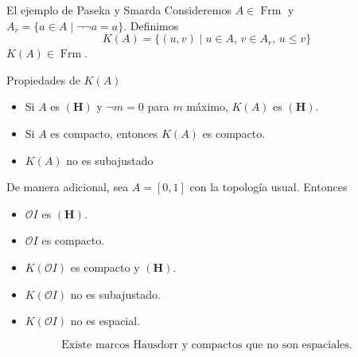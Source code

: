 \documentclass[compress,12pt]{beamer}
\DeclareMathOperator{\Frm}{Frm}
\begin{document}
\begin{frame}{El ejemplo de Paseka y Smarda}
Consideremos $A\in\Frm$ y $A_r=\{a\in A\mid \neg\neg a=a\}$. Definimos
\[
K(A)=\{(u,v)\mid u\in A,\, v\in A_r,\, u\leq v\}
\]
$K(A)\in \Frm$.
\begin{block}{Propiedades de $K(A)$}
\begin{itemize}
	\item Si $A$ es $\mathbf{(H)}$ y $\neg m=0$ para $m$ máximo, $K(A)$ es $\mathbf{(H)}$.
	\item Si $A$ es compacto, entonces $K(A)$ es compacto.
	\item $K(A)$ no es subajustado
\end{itemize}
\end{block}
\end{frame}

\begin{frame}
De manera adicional, sea $A=[0,1]$ con la topología usual. Entonces
\begin{itemize}
\item $\mathcal{O}I$ es $\mathbf{(H)}$.
\item $\mathcal{O}I$ es compacto.
\item $K(\mathcal{O}I)$ es compacto y $\mathbf{(H)}$.
\item $K(\mathcal{O}I)$ no es subajustado.
\item $K(\mathcal{O}I)$ no es espacial.
\end{itemize}

\[
\mbox{Existe marcos Hausdorr y compactos que no son espaciales}.
\]
\end{frame}
\end{document}
